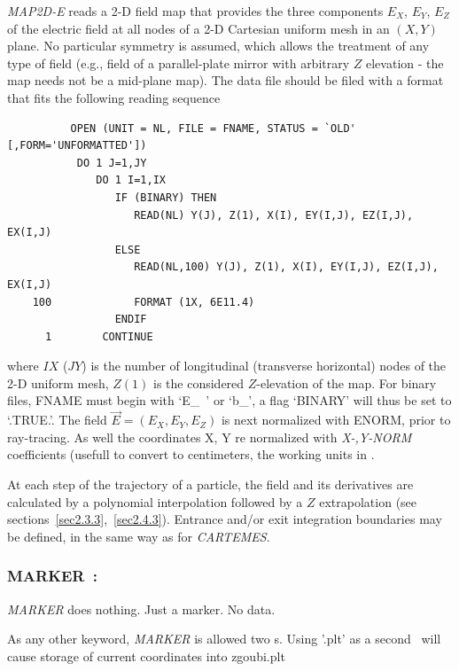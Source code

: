 \textsl{MAP2D-E} reads a 2-D field map that provides the three
components $ E_X$, $ E_Y $, $ E_Z $ of the electric field at all nodes of a 2-D Cartesian 
uniform mesh in an $(X,Y)$ plane. 
No particular symmetry is assumed, which allows the 
treatment of any type of field (e.g.,  field of a parallel-plate mirror with arbitrary $Z$ elevation 
- the map needs not be a mid-plane map). The data file should be filed with a 
format that fits the following \FORTRAN reading sequence 

{\footnotesize
\begin{verbatim}
	      OPEN (UNIT = NL, FILE = FNAME, STATUS = `OLD' [,FORM='UNFORMATTED'])
	       DO 1 J=1,JY 
	          DO 1 I=1,IX
	             IF (BINARY) THEN
	                READ(NL) Y(J), Z(1), X(I), EY(I,J), EZ(I,J), EX(I,J)
	             ELSE
	                READ(NL,100) Y(J), Z(1), X(I), EY(I,J), EZ(I,J), EX(I,J)
	100             FORMAT (1X, 6E11.4)
	             ENDIF
      1        CONTINUE
\end{verbatim}}
\medskip

\noindent where $IX$ ($JY$) is the number of longitudinal (transverse horizontal) nodes of 
the 2-D uniform mesh, $Z(1) $ is the considered $Z$-elevation of the map.   For 
binary files, FNAME must begin with \mbox{`E\_ '} or  \mbox{`b\_'}, a flag  `BINARY' will thus be 
set to `.TRUE.'. The field $ \vec  E=(E_X,E_Y,E_Z )$ is next normalized with 
ENORM, prior to ray-tracing.  As well the coordinates  X, Y re normalized with 
  \textsl{X-,Y-NORM} coefficients (usefull to convert to centimeters, the working units in  \zgoubi. 


\bigskip

\noindent At each step of the trajectory of a particle, the field and its 
derivatives are calculated by a polynomial interpolation followed 
by a $ Z $ extrapolation (see sections~\ref{sec2.3.3},~\ref{sec2.4.3}). Entrance and/or 
exit integration boundaries may be defined, in the same way as for \textsl{CARTEMES}.



\newpage

\subsubsection*{MARKER~: \MARKERTitl} \label{MARKER} 
\medskip

\textsl{MARKER} does nothing. Just a marker. No data. 

As any other keyword, \textsl{MARKER} is allowed two \LABEL s. Using 
 '.plt' as a second \LABEL\ will cause storage of current coordinates into zgoubi.plt 



